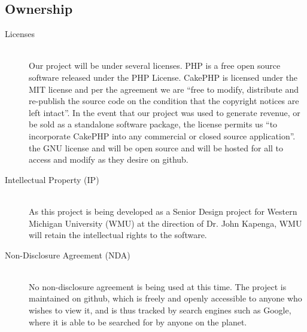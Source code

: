 \documentclass{report}
\begin{document}
\subsection*{Ownership}
\begin{description}
\item [Licenses] \hfill \\
Our project will be under several licenses. PHP is a free open source software released under the PHP License.  CakePHP is licensed under the MIT license and per the agreement we are “free to modify, distribute and re-publish the source code on the condition that the copyright notices are left intact”.  In the event that our project was used to generate revenue, or be sold as a standalone software package, the license permits us “to incorporate CakePHP into any commercial or closed source application”.  the GNU license and will be open source and will be hosted for all to access and modify as they desire on github.
\item [Intellectual Property (IP)] \hfill \\
As this project is being developed as a Senior Design project for Western Michigan University (WMU) at the direction of Dr. John Kapenga, WMU will retain the intellectual rights to the software.
\item [Non-Disclosure Agreement (NDA)] \hfill \\
No non-disclosure agreement is being used at this time.  The project is maintained on github, which is freely and openly accessible to anyone who wishes to view it, and is thus tracked by search engines such as Google, where it is able to be searched for by anyone on the planet.
\end{description}
\end{document}
